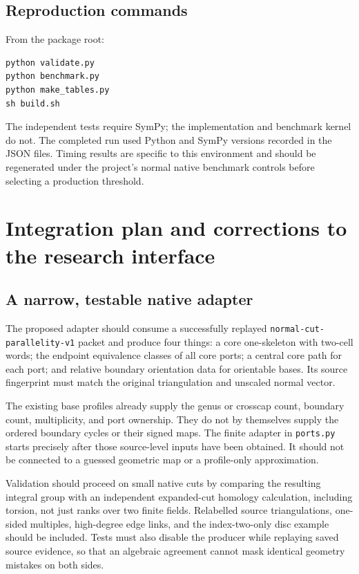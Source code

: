 \documentclass[11pt]{article}
\theoremstyle{definition}
\theoremstyle{remark}
\newcommand{\code}[1]{\texttt{#1}}
\begin{document}
\subsection{Reproduction commands}
From the package root:
\begin{lstlisting}
python validate.py
python benchmark.py
python make_tables.py
sh build.sh
\end{lstlisting}
The independent tests require SymPy; the implementation and benchmark
kernel do not. The completed run used Python and SymPy versions recorded
in the JSON files. Timing results are specific to this environment and
should be regenerated under the project's normal native benchmark controls
before selecting a production threshold.

\section{Integration plan and corrections to the research interface}
\label{sec:integration}

\subsection{A narrow, testable native adapter}
The proposed adapter should consume a successfully replayed
\code{normal-cut-parallelity-v1} packet and produce four things: a core
one-skeleton with two-cell words; the endpoint equivalence classes of all
core ports; a central core path for each port; and relative boundary
orientation data for orientable bases. Its source fingerprint must match
the original triangulation and unscaled normal vector.

The existing base profiles already supply the genus or crosscap count,
boundary count, multiplicity, and port ownership. They do not by themselves
supply the ordered boundary cycles or their signed maps. The finite adapter
in \code{ports.py} starts precisely after those source-level inputs have
been obtained. It should not be connected to a guessed geometric map or a
profile-only approximation.

Validation should proceed on small native cuts by comparing the resulting
integral group with an independent expanded-cut homology calculation,
including torsion, not just ranks over two finite fields. Relabelled source
triangulations, one-sided multiples, high-degree edge links, and the
index-two-only disc example should be included. Tests must also disable the
producer while replaying saved source evidence, so that an algebraic
agreement cannot mask identical geometry mistakes on both sides.
\end{document}
